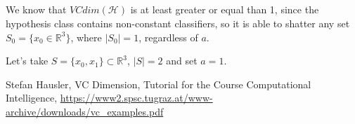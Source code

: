 \documentclass{article}
\begin{document}
\subsection{}
We know that $VCdim(\mathcal{H})$ is at least greater or equal than 1, since the hypothesis class contains non-constant classifiers, so it is able to shatter any set $S_0=\{x_0\in\mathbb{R}^3\}$, where $|S_0|=1$, regardless of $a$.

Let's take $S=\{x_0, x_1\}\subset\mathbb{R}^3$, $|S|=2$ and set $a=1$.
\newpage

\begin{thebibliography}{1.7} 
	 \color{cyan}Stefan Hausler, VC Dimension, Tutorial for the Course Computational Intelligence, \url{https://www2.spsc.tugraz.at/www-archive/downloads/vc_examples.pdf} \color{black}
	
\end{thebibliography}
\end{document}
